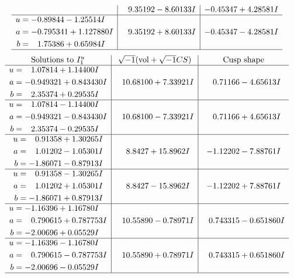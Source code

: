\documentclass[1p]{elsarticle_modified}
\theoremstyle{definition}
\newcommand{\I}{\sqrt{-1}}
\begin{document}
$$\begin{array}{c|c|c}
 & \phantom{-}9.35192 - 8.60133 I & -0.45347 + 4.28581 I \\ \hline\begin{aligned}
u &= -0.89844 - 1.25514 I \\
a &= -0.795341 + 1.127880 I \\
b &= \phantom{-}1.75386 + 0.65984 I\end{aligned}
 & \phantom{-}9.35192 + 8.60133 I & -0.45347 - 4.28581 I\\
 \hline 
 \end{array}$$\newpage$$\begin{array}{c|c|c}  
\text{Solutions to }I^u_{1}& \I (\text{vol} + \sqrt{-1}CS) & \text{Cusp shape}\\
 \hline 
\begin{aligned}
u &= \phantom{-}1.07814 + 1.14400 I \\
a &= -0.949321 + 0.843430 I \\
b &= \phantom{-}2.35374 + 0.29535 I\end{aligned}
 & \phantom{-}10.68100 + 7.33921 I & \phantom{-}0.71166 - 4.65613 I \\ \hline\begin{aligned}
u &= \phantom{-}1.07814 - 1.14400 I \\
a &= -0.949321 - 0.843430 I \\
b &= \phantom{-}2.35374 - 0.29535 I\end{aligned}
 & \phantom{-}10.68100 - 7.33921 I & \phantom{-}0.71166 + 4.65613 I \\ \hline\begin{aligned}
u &= \phantom{-}0.91358 + 1.30265 I \\
a &= \phantom{-}1.01202 - 1.05301 I \\
b &= -1.86071 - 0.87913 I\end{aligned}
 & \phantom{-}8.8427 + 15.8962 I & -1.12202 - 7.88761 I \\ \hline\begin{aligned}
u &= \phantom{-}0.91358 - 1.30265 I \\
a &= \phantom{-}1.01202 + 1.05301 I \\
b &= -1.86071 + 0.87913 I\end{aligned}
 & \phantom{-}8.8427 - 15.8962 I & -1.12202 + 7.88761 I \\ \hline\begin{aligned}
u &= -1.16396 + 1.16780 I \\
a &= \phantom{-}0.790615 + 0.787753 I \\
b &= -2.00696 + 0.05529 I\end{aligned}
 & \phantom{-}10.55890 - 0.78971 I & \phantom{-}0.743315 - 0.651860 I \\ \hline\begin{aligned}
u &= -1.16396 - 1.16780 I \\
a &= \phantom{-}0.790615 - 0.787753 I \\
b &= -2.00696 - 0.05529 I\end{aligned}
 & \phantom{-}10.55890 + 0.78971 I & \phantom{-}0.743315 + 0.651860 I\\
 \hline 
 \end{array}$$\newpage\newpage\renewcommand{\arraystretch}{1}
\end{document}
